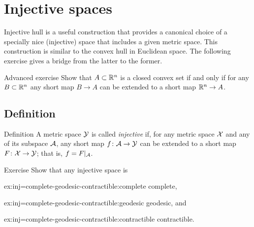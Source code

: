 \chapter{Injective spaces}\label{chap:injective}


Injective hull is a useful construction that provides a canonical choice of a specially nice (injective) space that includes a given metric space. 
This construction is similar to the convex hull in Euclidean space.
The following exercise gives a bridge from the latter to the former.

\begin{thm}{Advanced exercise}\label{ex:conv-short}
Show that $A\subset \mathbb{R}^n$ is a closed convex set if and only if for any  $B\subset \mathbb{R}^n$ any short map $B\to A$ can be extended to a short map $\mathbb{R}^n\to A$.
\end{thm}

\section{Definition}

\begin{thm}{Definition}\label{def:injective}
A metric space $\mathcal{Y}$ is called \emph{injective} if, for any metric space $\mathcal{X}$ and any of its subspace $\mathcal{A}$,
any short map $f\colon\mathcal{A}\to \mathcal{Y}$ can be extended to a short map $F\colon\mathcal{X}\to \mathcal{Y}$;
that is, $f=F|_{\mathcal{A}}$.
\end{thm}

\begin{thm}{Exercise}\label{ex:inj=complete-geodesic-contractible}
Show that any injective space is 
\begin{multicols}{3}

\begin{subthm}{ex:inj=complete-geodesic-contractible:complete}
complete,
\end{subthm}

\begin{subthm}{ex:inj=complete-geodesic-contractible:geodesic}
geodesic, and
\end{subthm}

\begin{subthm}{ex:inj=complete-geodesic-contractible:contractible}
contractible.
\end{subthm}

\end{multicols}

\end{thm}

